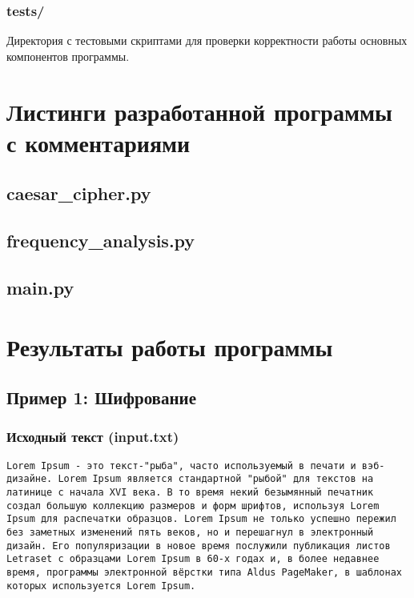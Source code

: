\documentclass[a4paper, 14pt]{report}
\begin{document}
\subsection{tests/}
Директория с тестовыми скриптами для проверки корректности работы основных компонентов программы.

\chapter{Листинги разработанной программы с комментариями}

\section{caesar\_cipher.py}



\section{frequency\_analysis.py}


\section{main.py}


\chapter{Результаты работы программы}

\section{Пример 1: Шифрование}

\subsection{Исходный текст (input.txt)}
\begin{lstlisting}
Lorem Ipsum - это текст-"рыба", часто используемый в печати и вэб-дизайне. Lorem Ipsum является стандартной "рыбой" для текстов на латинице с начала XVI века. В то время некий безымянный печатник создал большую коллекцию размеров и форм шрифтов, используя Lorem Ipsum для распечатки образцов. Lorem Ipsum не только успешно пережил без заметных изменений пять веков, но и перешагнул в электронный дизайн. Его популяризации в новое время послужили публикация листов Letraset с образцами Lorem Ipsum в 60-х годах и, в более недавнее время, программы электронной вёрстки типа Aldus PageMaker, в шаблонах которых используется Lorem Ipsum.
\end{lstlisting}
\end{document}
